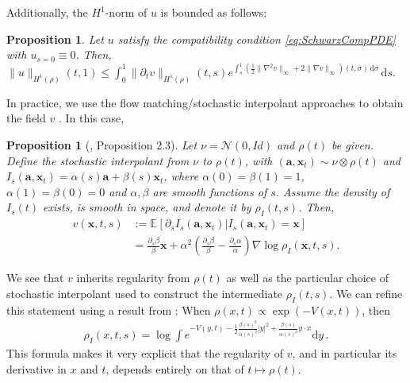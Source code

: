 \documentclass{article}
\newcommand{\bfx}{\boldsymbol{x}}
\newcommand{\bfa}{\boldsymbol{a}}
\newcommand{\rd}{\mathrm d}
\theoremstyle{definition}
\theoremstyle{plain}
\newtheorem{proposition}[theorem]{Proposition}
\theoremstyle{definition}
\theoremstyle{remark}
\begin{document}
Additionally, the $H^1$-norm of $u$ is bounded as follows:  
\begin{proposition}\label{prop:H1NormU}
Let $u$ satisfy the compatibility condition \eqref{eq:SchwarzCompPDE} with $u _{s=0} \equiv 0$. Then,
    $\| u \|_{H^1(\rho)}(t, 1) \leq \int_0^1 \| \partial_t v \|_{H^1(\rho)}(t, s) e^{ \int_s^1 \left( \frac{1}{2}\| \nabla^2 v \|_{\infty} + 2\| \nabla v \|_{\infty} \right)(t, \sigma) \, \rd \sigma } \, \rd s.
    $
\end{proposition}




In practice, we use the flow matching/stochastic interpolant approaches to obtain the field $v$ \cite{albergo2023stochastic, lipman2022flow, liu_flow_2023}. In this case,
\begin{proposition}[\citet{chen_lipschitz-guided_2025}, Proposition 2.3]
\label{prop:v_for_SIs}
    Let $\nu = \mathcal N(0, Id)$ and $\rho(t)$ be given. Define the stochastic interpolant from $\nu$ to $\rho(t)$, with $(\bfa, \bfx_t) \sim \nu \otimes \rho(t)$ and $I_s(\bfa, \bfx_t) = \alpha(s) \bfa + \beta(s) \bfx_t$, where $\alpha(0) = \beta(1) = 1$, $\alpha(1) = \beta(0) = 0$ and $\alpha, \beta$ are smooth functions of $s$. Assume the density of $I_s(t)$ exists, is smooth in space, and denote it by $\rho_I(t,s)$. Then,
    \begin{align}
        v(\bfx, t, s) &:= \mathbb{E}_{}[\partial_s I_s(\bfa, \bfx_t) | I_s(\bfa, \bfx_t) = \bfx] \\
        &= \frac{\partial_s \beta}{\beta} \bfx + \alpha^2 \left( \frac{\partial_s \beta}{\beta} - \frac{\partial_s \alpha}{\alpha} \right) \nabla \log \rho_I(\bfx,t,s). \nonumber
    \end{align}
\end{proposition}

We see that $v$ inherits regularity from $\rho(t)$ as well as the particular choice of stochastic interpolant used to construct the intermediate $\rho_I(t,s)$. We can refine this statement using a result from \cite{daniels_contractivity_2025}: When $\rho(x,t) \propto \exp(-V(x,t))$, then
\begin{align}
    \rho_I(x,t,s) = \log \int e^{ -V(y,t) - \frac 1 2 \frac{\beta(s)^2}{\alpha(s)^2} |y|^2 + \frac{\beta(s)}{\alpha(s)^2} y \cdot x } \rd y \, .
\end{align}
This formula makes it very explicit that the regularity of $v$, and in particular its derivative in $x$ and $t$, depends entirely on that of $t \mapsto \rho(t)$.
\end{document}

